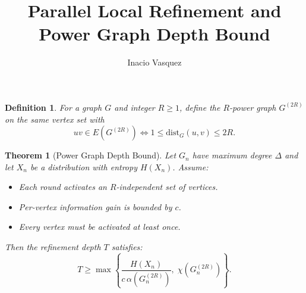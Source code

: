 \documentclass[11pt]{article}
\newtheorem{theorem}{Theorem}
\newtheorem{definition}{Definition}
\begin{document}
\title{Parallel Local Refinement and Power Graph Depth Bound}
\author{Inacio Vasquez}
\date{}
\maketitle

\begin{definition}
For a graph $G$ and integer $R \ge 1$, define the $R$-power graph $G^{(2R)}$
on the same vertex set with
\[
uv \in E(G^{(2R)}) \iff 1 \le \mathrm{dist}_G(u,v) \le 2R.
\]
\end{definition}

\begin{theorem}[Power Graph Depth Bound]
Let $G_n$ have maximum degree $\Delta$ and let $X_n$ be a distribution
with entropy $H(X_n)$. Assume:

\begin{itemize}
\item Each round activates an $R$-independent set of vertices.
\item Per-vertex information gain is bounded by $c$.
\item Every vertex must be activated at least once.
\end{itemize}

Then the refinement depth $T$ satisfies:
\[
T \ge 
\max \left\{
\frac{H(X_n)}{c\,\alpha(G_n^{(2R)})},
\;
\chi(G_n^{(2R)})
\right\}.
\]
\end{theorem}
\end{document}
